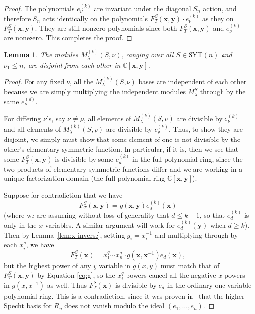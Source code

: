 \documentclass[11pt]{article}
\newtheorem{lemma}[theo]{Lemma}
\theoremstyle{definition}
\numberwithin{equation}{section}
\newcommand{\SYT}{\mathrm{SYT}}
\begin{document}
\begin{proof}
	The polynomials $e_\nu^{(k)}$ are invariant under the diagonal $S_n$ action, and therefore $S_n$ acts identically on the polynomials $F_T^S(\mathbf{x},\mathbf{y})\cdot e_\nu^{(k)}$ as they on $F_T^S(\mathbf{x},\mathbf{y})$.  They are still nonzero polynomials since both $F_T^S(\mathbf{x},\mathbf{y})$ and $e_\nu^{(k)}$ are nonezero.  This completes the proof.
\end{proof}

\begin{lemma}
	The modules $M^{(k)}_\lambda(S,\nu)$, ranging over all $S\in \SYT(n)$ and $\nu_1\le n$, are disjoint from each other in $\mathbb{C}[\mathbf{x},\mathbf{y}]$.
\end{lemma}

\begin{proof}
	For any fixed $\nu$, all the $M_\lambda^{(k)}(S,\nu)$ bases are independent of each other because we are simply multiplying the independent modules $M_\lambda^S$ through by the same $e_\nu^{(d)}$.  
	
	For differing $\nu$'s, say $\nu\neq \rho$, all elements of $M_\lambda^{(k)}(S,\nu)$ are divisible by $e_\nu^{(k)}$ and all elements of $M_\lambda^{(k)}(S,\rho)$ are divisible by $e_{\rho}^{(k)}$.  Thus, to show they are disjoint, we simply must show that some element of one is not divisible by the other's elementary symmetric function.  In particular, if it is, then we see that some $F_T^S(\mathbf{x},\mathbf{y})$ is divisible by some $e_d^{(k)}$ in the full polynomial ring, since the two products of elementary symmetric functions differ and we are working in a unique factorization domain (the full polynomial ring $\mathbb{C}[\mathbf{x},\mathbf{y}]$).
	
	Suppose for contradiction that we have \begin{equation}\label{eq:g}
	F_T^{S}(\mathbf{x},\mathbf{y})=g(\mathbf{x},\mathbf{y})e_d^{(k)}(\mathbf{x})
	\end{equation} (where we are assuming without loss of generality that $d\le k-1$, so that $e_d^{(k)}$ is only in the $x$ variables.  A similar argument will work for $e_d^{(k)}(\mathbf{y})$ when $d\ge k$).  Then by Lemma~\ref{lem:x-inverse}, setting $y_i=x_i^{-1}$ and multiplying through by each $x_i^q$, we have $$F_T^S(\mathbf{x})=x_1^q\cdots x_n^q \cdot g(\mathbf{x},\mathbf{x}^{-1})e_d(\mathbf{x}),$$ but the highest power of any $y$ variable in $g(x,y)$ must match that of $F_T^S(\mathbf{x},\mathbf{y})$ by Equation \eqref{eq:g}, so the $x_i^q$ powers cancel all the negative $x$ powers in $g(x,x^{-1})$ as well.  Thus $F_T^S(\mathbf{x})$ is divisible by $e_d$ in the ordinary one-variable polynomial ring.  This is a contradiction, since it was proven in~\cite{ATY} that the higher Specht basis for $R_n$ does not vanish modulo the ideal $(e_1,\ldots,e_n)$.  
\end{proof}
\end{document}
